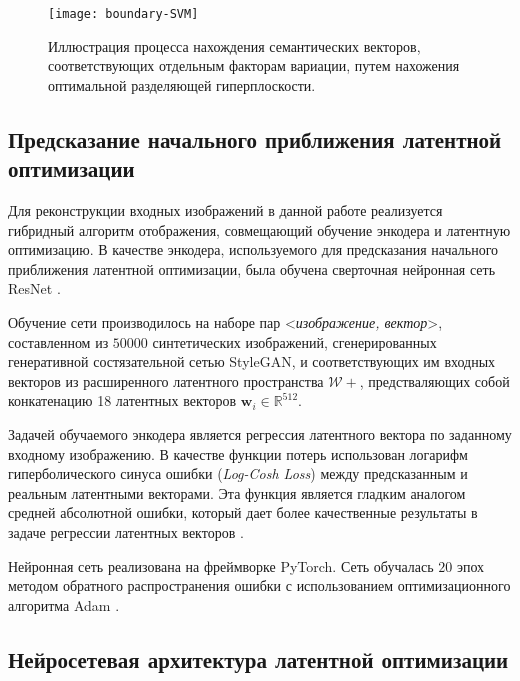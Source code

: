 \begin{figure}[h]
\begin{center}
    \texttt{[image: boundary-SVM]}
    \caption{Иллюстрация процесса нахождения семантических векторов, соответствующих отдельным факторам вариации, путем нахожения оптимальной разделяющей гиперплоскости.}
    \label{fig:svm-boundary}
\end{center}
\end{figure}


\subsection{Предсказание начального приближения латентной оптимизации}

Для реконструкции входных изображений в данной работе реализуется гибридный алгоритм отображения, совмещающий обучение энкодера и латентную оптимизацию.
В качестве энкодера, используемого для предсказания начального приближения латентной оптимизации, была обучена сверточная нейронная сеть ResNet \cite{he2016resnet}.

Обучение сети производилось на наборе пар <\emph{изображение, вектор}>, составленном из $50000$ синтетических изображений, сгенерированных генеративной состязательной сетью StyleGAN, и соответствующих им входных векторов из расширенного латентного пространства $\mathcal W+$, предстваляющих собой конкатенацию 18 латентных векторов $\mathbf w_i \in \mathbb R^{512}$.

Задачей обучаемого энкодера является регрессия латентного вектора по заданному входному изображению.
В качестве функции потерь использован логарифм гиперболического синуса ошибки (\emph{Log-Cosh Loss}) между предсказанным и реальным латентными векторами. Эта функция является гладким аналогом средней абсолютной ошибки, который дает более качественные результаты в задаче регрессии латентных векторов \cite{chen2019log}.

Нейронная сеть реализована на фреймворке PyTorch. Сеть обучалась $20$ эпох методом обратного распространения ошибки с использованием оптимизационного алгоритма Adam \cite{kingma2014adam}.



\subsection{Нейросетевая архитектура латентной оптимизации}


